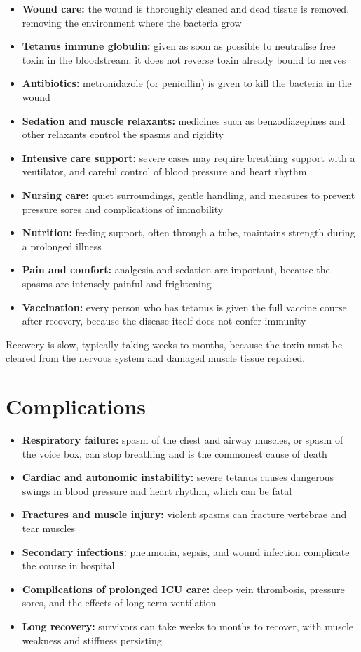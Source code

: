 \begin{itemize}
    \item \textbf{Wound care:} the wound is thoroughly cleaned and dead tissue is removed, removing the environment where the bacteria grow
    \item \textbf{Tetanus immune globulin:} given as soon as possible to neutralise free toxin in the bloodstream; it does not reverse toxin already bound to nerves
    \item \textbf{Antibiotics:} metronidazole (or penicillin) is given to kill the bacteria in the wound
    \item \textbf{Sedation and muscle relaxants:} medicines such as benzodiazepines and other relaxants control the spasms and rigidity
    \item \textbf{Intensive care support:} severe cases may require breathing support with a ventilator, and careful control of blood pressure and heart rhythm
    \item \textbf{Nursing care:} quiet surroundings, gentle handling, and measures to prevent pressure sores and complications of immobility
    \item \textbf{Nutrition:} feeding support, often through a tube, maintains strength during a prolonged illness
    \item \textbf{Pain and comfort:} analgesia and sedation are important, because the spasms are intensely painful and frightening
    \item \textbf{Vaccination:} every person who has tetanus is given the full vaccine course after recovery, because the disease itself does not confer immunity
\end{itemize}

Recovery is slow, typically taking weeks to months, because the toxin must be cleared from the nervous system and damaged muscle tissue repaired.

\section*{Complications}
\begin{itemize}
    \item \textbf{Respiratory failure:} spasm of the chest and airway muscles, or spasm of the voice box, can stop breathing and is the commonest cause of death
    \item \textbf{Cardiac and autonomic instability:} severe tetanus causes dangerous swings in blood pressure and heart rhythm, which can be fatal
    \item \textbf{Fractures and muscle injury:} violent spasms can fracture vertebrae and tear muscles
    \item \textbf{Secondary infections:} pneumonia, sepsis, and wound infection complicate the course in hospital
    \item \textbf{Complications of prolonged ICU care:} deep vein thrombosis, pressure sores, and the effects of long-term ventilation
    \item \textbf{Long recovery:} survivors can take weeks to months to recover, with muscle weakness and stiffness persisting
\end{itemize}

